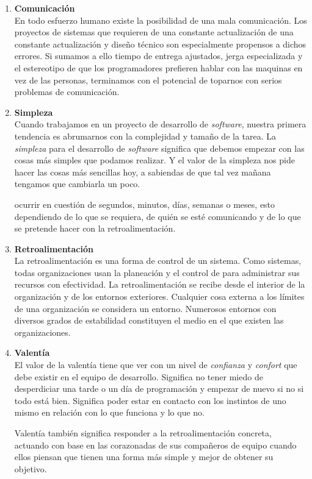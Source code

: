 \documentclass[12pt]{article}
\begin{document}
\begin{enumerate}
  \item {\bf Comunicación }\\
    En todo esfuerzo humano existe la posibilidad de una mala comunicación.
    Los proyectos de sistemas que requieren de una constante actualización de una
    constante actualización y diseño técnico son especialmente propensos a dichos 
    errores. Si sumamos a ello tiempo de entrega ajustados, jerga especializada y 
    el estereotipo de que los programadores prefieren hablar con las maquinas en vez
    de las personas, terminamos con el potencial de toparnos con serios problemas
    de comunicación.

  \item {\bf Simpleza }\\
    Cuando trabajamos en un proyecto de desarrollo de {\it software}, nuestra primera
    tendencia es abrumarnos con la complejidad y tamaño de la tarea.
    La {\it simpleza } para el desarrollo de {\it software} significa que debemos 
    empezar con las cosas más simples que podamos realizar. Y el valor de la simpleza
    nos pide hacer las cosas más sencillas hoy, a sabiendas de que tal vez mañana 
    tengamos que cambiarla un poco.

    ocurrir en cuestión de segundos, minutos, días, semanas o meses, esto
    dependiendo de lo que se requiera, de quién se esté comunicando y de lo que se
    pretende hacer con la retroalimentación.

  \item {\bf Retroalimentación }\\
    La retroalimentación es una forma de control de un sistema. Como sistemas, todas organizaciones usan la planeación y el control de para administrar sus recursos con efectividad.
    La retroalimentación se recibe desde el interior de la organización y de los entornos
    exteriores. Cualquier cosa externa a los límites de una organización se considera un entorno. Numerosos entornos con diversos grados de estabilidad constituyen el medio en el que existen las organizaciones.


  \item {\bf Valentía }\\
    El valor de la valentía tiene que ver con un nivel de {\it confianza} y
    {\it confort} que debe existir en el equipo de desarrollo. Significa no tener
    miedo de desperdiciar una tarde o un día de programación y empezar de nuevo si
    no si todo está bien. Significa poder estar en contacto con los instintos de
    uno mismo en relación con lo que funciona y lo que no.

    Valentía también significa responder a la retroalimentación concreta, actuando
    con base en las corazonadas de sus compañeros de equipo cuando ellos piensan 
    que tienen una forma más simple y mejor de obtener su objetivo.
\end{enumerate}
\end{document}
